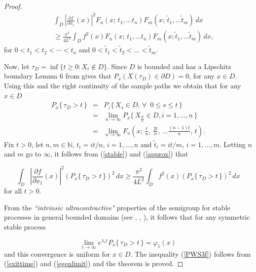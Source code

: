 \documentclass[11pt,leqno]{article}
\theoremstyle{definition}
\newcommand{\N}{\mathbb{N}}
\numberwithin{equation}{section}
\begin{document}
\begin{proof}
 
\begin{eqnarray}\label{stable}
&&\int_{D} \left| \frac{\partial f}{\partial x_1} (x) \right|^{2} F_n(x;\,   t_1, \dots t_n)F_m(x; \, \tilde t_1,
\dots\tilde  t_m)
\, dx\\
&& \ge 
\frac{\pi^{2}}{4 L^{2}} 
 \int_{D} f^{2}(x) F_n(x;\, t_1, \dots t_n)F_m(x; \tilde t_1,
\dots\tilde  t_m)\, dx,\nonumber
\end{eqnarray}
for $0<t_1<t_2<\cdots <t_n$ and $0<\tilde t_1 <\tilde t_2<
\dots<\tilde  t_m$.

Now, let $\tau_D=\inf\{t \ge 0: X_t\notin D\}$. Since $D$ is bounded
and has a Lipschitz boundary Lemma 6 from \cite{Bo} gives that $P_x(X(\tau_D) \in \partial D) = 0$, for any $x \in D$. Using this and the right
continuity of the sample paths we obtain that for any $x \in D$
\begin{eqnarray}\label{approx}
P_x\{ \,\tau_D >t\,\} &=& P_z\{\,  X_{s} \in D, \, \forall \,\,\,   0\leq s
\leq t\,\}\\
&=&\lim_{n \to \infty} P_x \{\, X_{\frac{it}{n}} \in
D, i= 1,\ldots,n\,\}\nonumber\\
&=&\lim_{n \to \infty}
F_n\left(x;\, {\frac{t}{n}} , \, \frac{2t}{n}, \,  \dots \frac{(n-1)t}{n}, \,   t\right) . \nonumber
\end{eqnarray}
Fix $t > 0$, let $n,m \in \N$, $t_i = it/n$, $i = 1, \ldots,n$ and $\tilde t_i =it/m$, $i =1,
\ldots,m$. Letting $n$ and $m$ go to $\infty$,  it follows from (\ref{stable}) and
(\ref{approx}) that


\begin{equation}\label{exittime}
\int_{D} \left| \frac{\partial f}{\partial x_1} (x) \right|^{2}\left( P_x\{ \,\tau_D >t\,\} \right)^2
\, dx \ge 
\frac{\pi^{2}}{4 L^{2}} 
 \int_{D} f^{2}(x)\left(P_x\{ \,\tau_D >t\,\}\right)^2\, dx 
\end{equation}
for all $t>0$.

From the {\it ``intrinsic ultracontractive"} properties of the semigroup
for stable processes in general bounded domains (see \cite{CS1}, \cite{CS2}, \cite{K}), it follows that for any
symmetric stable process 

\begin{equation}\label{egenlimit}
\lim_{t \to \infty}e^{\lambda_1 t}P_x\{ \,\tau_D >t\,\}=\varphi_1(x)
\end{equation}
and this convergence is uniform for $x\in D$.  The inequality (\ref{PWS3f}) follows from (\ref{exittime})
and (\ref{egenlimit}) and the theorem is proved. 

 
\end{proof}
\end{document}

